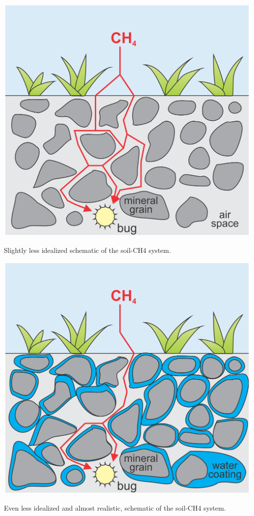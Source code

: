 \documentclass{tufte-book} %
\begin{document}
\begin{marginfigure}[-1.5in]
\includegraphics[width=\linewidth]{ch4-soilmodel2.png}
\caption{Slightly less idealized schematic of the soil-CH4 system.}
\label{fig:ch4-soilmodel2}
\end{marginfigure}

\begin{marginfigure}[0.0in]
\includegraphics[width=\linewidth]{ch4-soilmodel3.png}
\caption{Even less idealized and almost realistic, schematic of the soil-CH4 system.}
\label{fig:ch4-soilmodel3}
\end{marginfigure}
\end{document}
